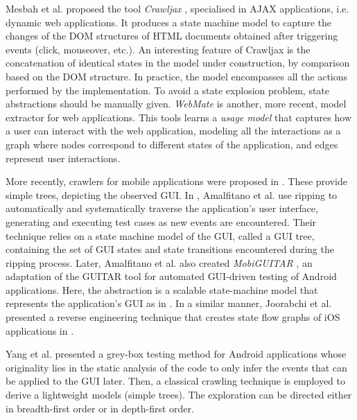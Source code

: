 Mesbah et al. proposed the tool \textit{Crawljax}
\cite{crawljax:tweb12}, specialised in AJAX applications, i.e.
dynamic web applications.  It produces a state machine model to
capture the changes of the DOM structures of HTML documents
obtained after triggering events (click, mouseover, etc.). An
interesting feature of Crawljax is the concatenation of identical
states in the model under construction, by comparison based on
the DOM structure. In practice, the model encompasses all the
actions performed by the implementation. To avoid a state
explosion problem, state abstractions should be manually given.
\textit{WebMate} \cite{webmate12} is another, more recent, model
extractor for web applications. This tools learns a \textit{usage
model} that captures how a user can interact with the web
application, modeling all the interactions as a graph where
nodes correspond to different states of the application, and
edges represent user interactions.

More recently, crawlers for mobile applications were proposed in
\cite{Amalfitano:2012:UGR:2351676.2351717,Joorabchi:2012:REI:2420240.2420457,MobiGUITARIEEESoftware2014}.
These provide simple trees, depicting the observed GUI. In
\cite{Amalfitano:2012:UGR:2351676.2351717}, Amalfitano et al. use
ripping to automatically and systematically traverse the
application's user interface, generating and executing test cases
as new events are encountered. Their technique relies on a state
machine model of the GUI, called a GUI tree, containing the set
of GUI states and state transitions encountered during the
ripping process.  Later, Amalfitano et al. also created
\textit{MobiGUITAR} \cite{MobiGUITARIEEESoftware2014}, an
adaptation of the GUITAR tool for automated GUI-driven testing of
Android applications. Here, the abstraction is a scalable
state-machine model that represents the application's GUI as in
\cite{Amalfitano:2012:UGR:2351676.2351717}. In a similar manner,
Joorabchi et al. presented a reverse engineering technique that
creates state flow graphs of iOS applications in
\cite{Joorabchi:2012:REI:2420240.2420457}.

Yang et al. \cite{WPX13} presented a grey-box testing method for
Android applications whose originality lies in the static
analysis of the code to only infer the events that can be applied
to the GUI later. Then, a classical crawling technique is
employed to derive a lightweight models (simple trees). The
exploration can be directed either in breadth-first order or in
depth-first order.

